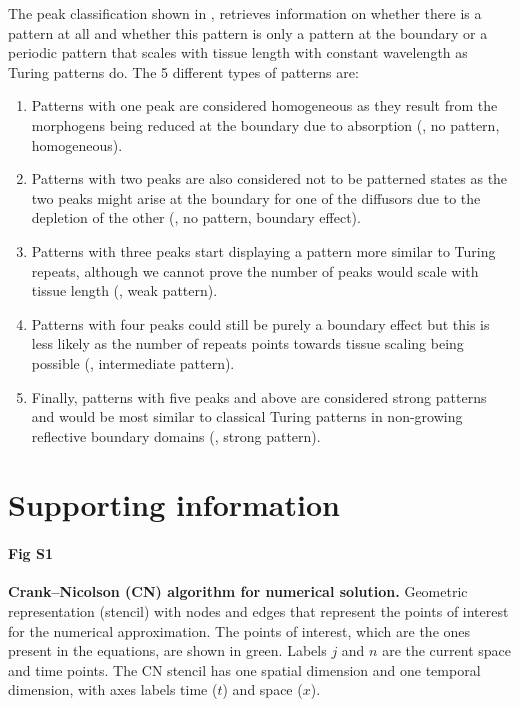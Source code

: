 \documentclass[10pt,letterpaper]{article}
\begin{document}
The peak classification shown in , retrieves information on whether there is a pattern at all and whether this pattern is only a pattern at the boundary or a periodic pattern that scales with tissue length with constant wavelength as Turing patterns do.
The 5 different types of patterns are:
\begin{enumerate}
    \item Patterns with one peak are considered homogeneous as they result from the morphogens being reduced at the boundary due to absorption (, no pattern, homogeneous).
    \item Patterns with two peaks are also considered not to be patterned states as the two peaks might arise at the boundary for one of the diffusors due to the depletion of the other (, no pattern, boundary effect).
    \item Patterns with three peaks start displaying a pattern more similar to Turing repeats, although we cannot prove the number of peaks would scale with tissue length  (, weak pattern).
    \item Patterns with four peaks could still be purely a boundary effect but this is less likely as the number of repeats points towards tissue scaling being possible (, intermediate pattern).
    \item Finally, patterns with five peaks and above are considered strong patterns and would be most similar to classical Turing patterns in non-growing reflective boundary domains (, strong pattern).
\end{enumerate}





\section*{Supporting information}
%
\paragraph*{Fig S1}
\label{sup_fig1}
{\bf Crank–Nicolson (CN) algorithm for numerical solution.}  Geometric representation (stencil) with nodes and edges that represent the points of interest for the numerical approximation. The points of interest, which are the ones present in the equations, are shown in green. Labels $j$ and $n$ are the current space and time points. The CN stencil has one spatial dimension and one temporal dimension, with axes labels time ($t$) and space ($x$).
\end{document}
